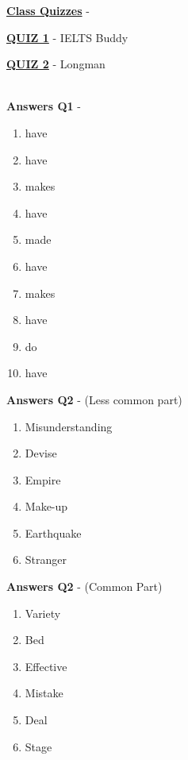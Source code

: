 \documentclass[a4paper,30pt]{report}
\begin{document}
      \underline{\textbf{Class Quizzes}} - \\
      \par \href{https://www.ieltsbuddy.com/collocation-quiz.html?authuser=1}{\textbf{QUIZ 1}} - IELTS Buddy
      \par \href{https://www.ldoceonline.com/quiz/section-collocations/?authuser=1}{\textbf{QUIZ 2}} - Longman\\\\


      \par \textbf{Answers Q1} -  
      \begin{enumerate} 
        \item have 
        \item have 
        \item makes
        \item have 
        \item made 
        \item have 
        \item makes
        \item have 
        \item do 
        \item have 
      \end{enumerate}

      \newpage 

      \par \textbf{Answers Q2} -  (Less common part)
      \begin{enumerate}
        \item Misunderstanding
        \item Devise
        \item Empire 
        \item Make-up
        \item Earthquake
        \item Stranger
      \end{enumerate}

      \par \textbf{Answers Q2} - (Common Part)
      \begin{enumerate}
        \item Variety 
        \item Bed 
        \item Effective 
        \item Mistake 
        \item Deal
        \item Stage
      \end{enumerate}
\end{document}
